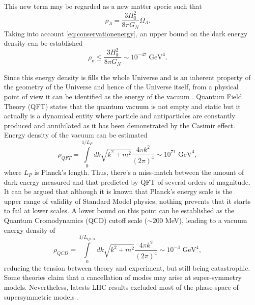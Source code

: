 This new term may be regarded as a new matter specie such that
\begin{equation}
\rho_\Lambda = \frac{3H_0^2}{8\pi G_N}\Omega_\Lambda.
\end{equation}
Taking into account \autoref{eq:conservationenergy}, an upper bound on the dark energy density can be established
\begin{equation}
\rho_v \leq \frac{3H_0^2}{8\pi G_N} \sim 10 ^{-47} \mbox{ GeV}^4.
\end{equation}
\newline

Since this energy density is fills the whole Universe and is an inherent property of the geometry of the Universe and hence of the Universe itself, from a physical point of view it can be identified as the energy of the vacuum \cite{RevModPhys.61.1,2003PhR...380..235P}. Quantum Field Theory (QFT) states that the quantum vacuum is not empty and static but it actually is a dynamical entity where particle and antiparticles are constantly produced and annihilated as it has been demonstrated by the Casimir effect. Energy density of the vacuum can be estimated
\begin{equation}
\rho_{QFT} = \int\limits_0^{1/L_P} dk \sqrt{k^2+m^2}\frac{4\pi k^2}{(2\pi)^4}\sim 10^{71}\mbox{ GeV}^4,
\end{equation}
where $L_P$ is Planck's length. Thus, there's a miss-match between the amount of dark energy measured and that predicted by QFT of several orders of magnitude. It can be argued that although it is known that Planck's energy scale is the upper range of validity of Standard Model physics, nothing prevents that it starts to fail at lower scales. A lower bound on this point can be established as the Quantum Cromodynamics (QCD) cutoff scale ($\sim 200$ MeV), leading to a vacuum energy density of
\begin{equation}
\rho_{QCD} = \int\limits_0^{1/L_{QCD}} dk \sqrt{k^2+m^2}\frac{4\pi k^2}{(2\pi)^4}\sim 10^{-3}\mbox{ GeV}^4,
\end{equation}
reducing the tension between theory and experiment, but still being catastrophic. Some theories claim that a cancellation of modes may arise at super-symmetry models. Nevertheless, latests LHC results excluded most of the phase-space of supersymmetric models \cite{2015arXiv150603091B}.
\newline

